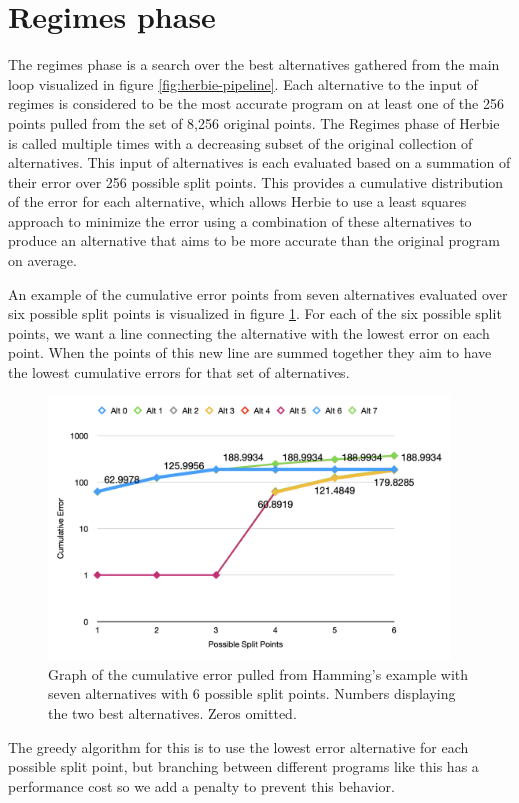 \documentclass{article}
\begin{document}
\section{Regimes phase}
The regimes phase is a search over the best alternatives gathered from the main loop visualized in figure \ref{fig:herbie-pipeline}.  Each alternative to the input of regimes is considered to be the most accurate program on at least one of the 256 points pulled from the set of 8,256 original points. The Regimes phase of Herbie is called multiple times with a decreasing subset of the original collection of alternatives. This input of alternatives is each evaluated based on a summation of their error over 256 possible split points. This provides a cumulative distribution of the error for each alternative, which allows Herbie to use a least squares approach to minimize the error using a combination of these alternatives to produce an alternative that aims to be more accurate than the original program on average. 

An example of the cumulative error points from seven alternatives evaluated over six possible split points is visualized in figure \ref{fig:cumulative-error}. For each of the six possible split points, we want a line connecting the alternative with the lowest error on each point. When the points of this new line are summed together they aim to have the lowest cumulative errors for that set of alternatives.

\begin{figure}[htbp]
\begin{center}
\includegraphics[width=0.95\textwidth]{cumulative-error-graph.png}
\caption{Graph of the cumulative error pulled from Hamming's example with seven alternatives with 6 possible split points. Numbers displaying the two best alternatives. Zeros omitted.}
\label{fig:cumulative-error} 
\end{center}
\end{figure}
The greedy algorithm for this is to use the lowest error alternative for each possible split point, but branching between different programs like this has a performance cost so we add a penalty to prevent this behavior. 
\end{document}
